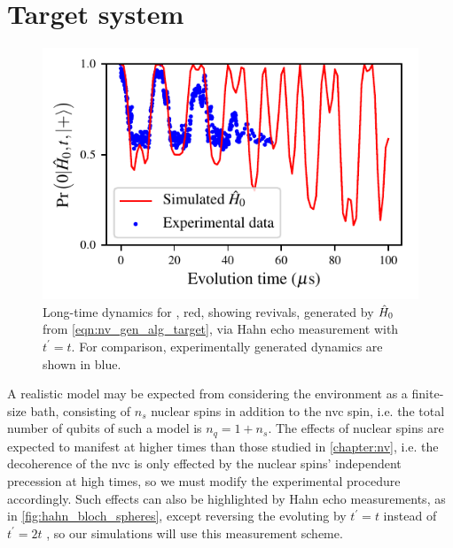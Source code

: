 \section{Target system}
\begin{figure}
    \begin{center}
        \includegraphics{experimental_study/figures/nv_revival_raw_data.pdf}
    \end{center}
    \caption[Long-time dynamics for ]{
        Long-time dynamics for , red, showing revivals, 
            generated by $\hat{H}_0$ from \cref{eqn:nv_gen_alg_target}, via Hahn echo measurement with $t^{\prime} = t$.
        For comparison, experimentally generated dynamics are shown in blue. 
    }
    \label{fig:nv_revival_raw}
\end{figure}
A realistic model may be expected from considering the environment as a finite-size bath, 
    consisting of $n_s$ nuclear spins in addition to the \gls{nvc} spin, 
    i.e. the total number of qubits of such a model is $n_q = 1 + n_s$.   
The effects of nuclear spins are expected to manifest at higher times than those studied in \cref{chapter:nv}, 
    i.e. the decoherence of the \gls{nvc} is only effected by the nuclear spins' independent precession at high times, 
    so we must modify the experimental procedure accordingly.
Such effects can also be highlighted by Hahn echo measurements, 
    as in \cref{fig:hahn_bloch_spheres}, 
    except reversing the evoluting by $t^{\prime} = t$ instead of $t^{\prime} = 2t$
    \cite{childress2006coherent, breuer2002theory}, so our simulations will use this measurement scheme. 
\par 

